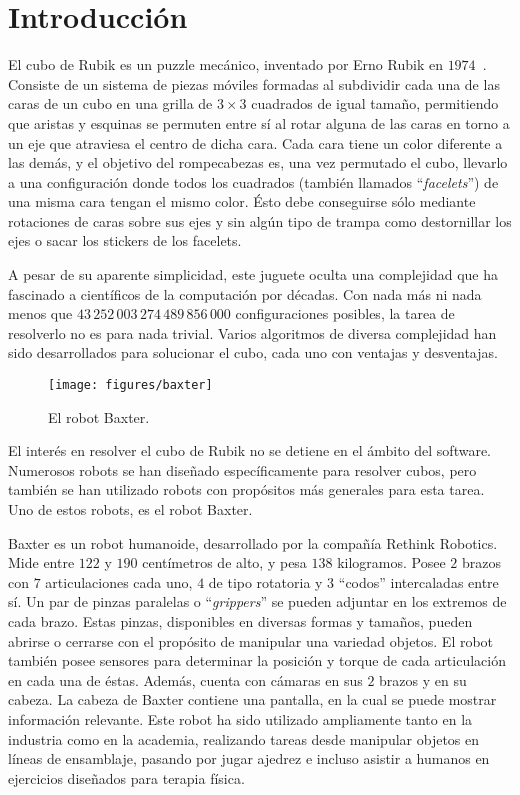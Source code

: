 \chapter{Introducción}

El cubo de Rubik es un puzzle mecánico, inventado por Erno Rubik en $1974$~\cite{ernorubik1974}. Consiste de un sistema de piezas móviles formadas al subdividir cada una de las caras de un cubo en una grilla de $3\times 3$ cuadrados de igual tamaño, permitiendo que aristas y esquinas se permuten entre sí al rotar alguna de las caras en torno a un eje que atraviesa el centro de dicha cara. Cada cara tiene un color diferente a las demás, y el objetivo del rompecabezas es, una vez permutado el cubo, llevarlo a una configuración donde todos los cuadrados (también llamados ``\emph{facelets}'') de una misma cara tengan el mismo color. Ésto debe conseguirse sólo mediante rotaciones de caras sobre sus ejes y sin algún tipo de trampa como destornillar los ejes o sacar los stickers de los facelets.

A pesar de su aparente simplicidad, este juguete oculta una complejidad que ha fascinado a científicos de la computación por décadas. Con nada más ni nada menos que $43\,252\,003\,274\,489\,856\,000$ configuraciones posibles\cite{mathematicsrubik}, la tarea de resolverlo no es para nada trivial. Varios algoritmos de diversa complejidad han sido desarrollados para solucionar el cubo, cada uno con ventajas y desventajas.

\begin{figure}[ht]
	\centering
	\texttt{[image: figures/baxter]}
	\caption{El robot Baxter.}
	\label{baxter}
\end{figure}

El interés en resolver el cubo de Rubik no se detiene en el ámbito del software. Numerosos robots se han diseñado específicamente para resolver cubos, pero también se han utilizado robots con propósitos más generales para esta tarea. Uno de estos robots, es el robot Baxter.

Baxter es un robot humanoide, desarrollado por la compañía Rethink Robotics\cite{baxterproduct}. Mide entre $122$ y $190$ centímetros de alto, y pesa $138$ kilogramos. Posee $2$ brazos con $7$ articulaciones cada uno, $4$ de tipo rotatoria y $3$ ``codos'' intercaladas entre sí. Un par de pinzas paralelas o ``\emph{grippers}'' se pueden adjuntar en los extremos de cada brazo. Estas pinzas, disponibles en diversas formas y tamaños, pueden abrirse o cerrarse con el propósito de manipular una variedad objetos. El robot también posee sensores para determinar la posición y torque de cada articulación en cada una de éstas. Además, cuenta con cámaras en sus $2$ brazos y en su cabeza. La cabeza de Baxter contiene una pantalla, en la cual se puede mostrar información relevante\cite{baxterspecs}.
Este robot ha sido utilizado ampliamente tanto en la industria como en la academia, realizando tareas desde manipular objetos en líneas de ensamblaje\cite{baxtersupply}, pasando por jugar ajedrez\cite{baxterchess} e incluso asistir a humanos en ejercicios diseñados para terapia física\cite{baxterassistive}.

